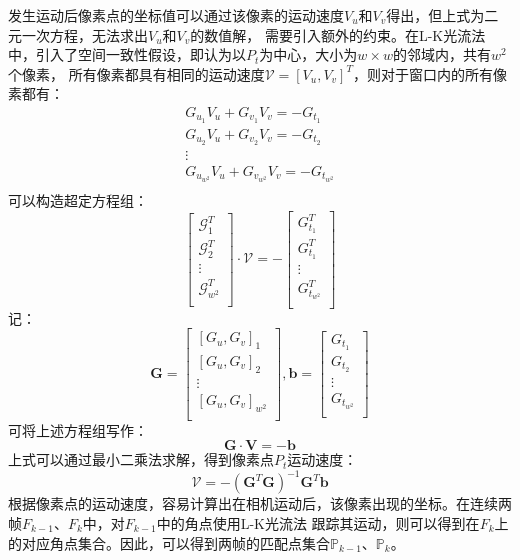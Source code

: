 发生运动后像素点的坐标值可以通过该像素的运动速度$V_{u}$和$V_{v}$得出，但上式为二元一次方程，无法求出$V_{u}$和$V_{v}$的数值解，
需要引入额外的约束。在L-K光流法中，引入了空间一致性假设，即认为以$P_{t}$为中心，大小为$w\times w$的邻域内，共有$w^{2}$个像素，
所有像素都具有相同的运动速度$\mathcal{V}=\left[V_{u},V_{v}\right]^{T}$，则对于窗口内的所有像素都有：
$$
\begin{array}{l}
    G_{u_{1}}V_{u}+ G_{v_{1}}V_{v}=-G_{t_{1}} \\  
    G_{u_{2}}V_{u}+ G_{v_{2}}V_{v}=-G_{t_{2}} \\ 
    \vdots\\ 
    G_{u_{w^{2}}}V_{u}+ G_{v_{w^{2}}}V_{v}=-G_{t_{w^{2}}} \\  
\end{array}
$$
可以构造超定方程组：
$$
\left[
\begin{array}{l}
    \mathcal{G}_{1}^{T} \\  
    \mathcal{G}_{2}^{T} \\   
    \vdots\\ 
    \mathcal{G}_{w^{2}}^{T} \\   
\end{array}
\right]
\cdot 
\mathcal{V}
=
-
\left[
\begin{array}{l}
    G_{t_{1}}^{T} \\  
    G_{t_{1}}^{T} \\   
    \vdots\\ 
    G_{t_{w^{2}}}^{T} \\   
\end{array}
\right]
$$
记：
$$
\textbf{G}=
\left[
\begin{array}{l}
    \left[G_{u},G_{v}\right]_{1}\\  
    \left[G_{u},G_{v}\right]_{2} \\   
    \vdots\\ 
    \left[G_{u},G_{v}\right]_{w^{2}} \\   
\end{array}
\right]
,
\textbf{b}=
\left[
\begin{array}{l}
    G_{t_{1}}\\  
    G_{t_{2}} \\   
    \vdots\\ 
    G_{t_{w^{2}}} \\   
\end{array}
\right]
$$
可将上述方程组写作：
$$\textbf{G}\cdot\textbf{V}=-\textbf{b}$$
上式可以通过最小二乘法求解，得到像素点$P_{t}$运动速度：
$$
\mathcal{V}=-(\textbf{G}^{T}\textbf{G})^{-1}\textbf{G}^{T}\textbf{b}
$$
根据像素点的运动速度，容易计算出在相机运动后，该像素出现的坐标。在连续两帧$F_{k-1}$、$F_{k}$中，对$F_{k-1}$中的角点使用L-K光流法
跟踪其运动，则可以得到在$F_{k}$上的对应角点集合。因此，可以得到两帧的匹配点集合$\mathbb{P}_{k-1}$、$\mathbb{P}_{k}$。
